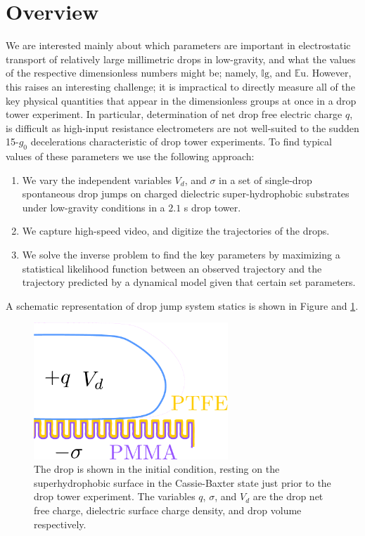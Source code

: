 \documentclass[12pt,a4paper,oneside]{book}
\begin{document}
\section{Overview}
We are interested mainly about which parameters are important in electrostatic transport of relatively large millimetric drops in low-gravity, and what the values of the respective dimensionless numbers might be; namely, $\mathbb{I}\mbox{g}$, and $\mathbb{E}\mbox{u}$. However, this raises an interesting challenge; it is impractical to directly measure all of the key physical quantities that appear in the dimensionless groups at once in a drop tower experiment. In particular, determination of net drop free electric charge $q$, is difficult as high-input resistance electrometers are not well-suited to the sudden 15-$g_0$ decelerations characteristic of drop tower experiments. To find typical values of these parameters we use the following approach:
\begin{enumerate}
\item We vary the independent variables $V_d$, and $\sigma$ in a set of single-drop spontaneous drop jumps on charged dielectric super-hydrophobic substrates under low-gravity conditions in a $2.1$ s drop tower. 
\item We capture high-speed video, and digitize the trajectories of the drops. 
\item We solve the inverse problem to find the key parameters by maximizing a statistical likelihood function between an observed trajectory and the trajectory predicted by a dynamical model given that certain set parameters.
\end{enumerate}
A schematic representation of drop jump system statics is shown in Figure and \ref{fig:schematic}.
\begin{figure}[ht]
 \centering
 \includegraphics[width=0.65\textwidth]{../figures/schematic.pdf}
 \caption{The drop is shown in the initial condition, resting on the superhydrophobic surface in the Cassie-Baxter state just prior to the drop tower experiment. The variables $q$, $\sigma$, and $V_d$ are the drop net free charge, dielectric surface charge density, and drop volume respectively.\label{fig:schematic}}
\end{figure}
\end{document}
